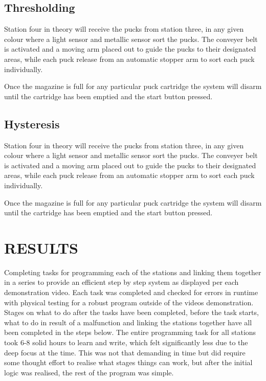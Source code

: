 \documentclass[a4paper, 10pt]{article}
\begin{document}
\subsection{Thresholding}
Station four in theory will receive the pucks from station three, in any given colour where a light sensor and metallic sensor sort the pucks. The conveyer belt is activated and a moving arm placed out to guide the pucks to their designated areas, while each puck release from an automatic stopper arm to sort each puck individually. 

Once the magazine is full for any particular puck cartridge the system will disarm until the cartridge has been emptied and the start button pressed.



\subsection{Hysteresis}
Station four in theory will receive the pucks from station three, in any given colour where a light sensor and metallic sensor sort the pucks. The conveyer belt is activated and a moving arm placed out to guide the pucks to their designated areas, while each puck release from an automatic stopper arm to sort each puck individually. 

Once the magazine is full for any particular puck cartridge the system will disarm until the cartridge has been emptied and the start button pressed.



\section{RESULTS}
Completing tasks for programming each of the stations and linking them together in a series to provide an efficient step by step system as displayed per each demonstration video. Each task was completed and checked for errors in runtime with physical testing for a robust program outside of the videos demonstration. Stages on what to do after  the tasks have been completed, before the task starts, what to do in result of a malfunction and linking the stations together have all been completed in the steps below. The entire programming task for all stations took 6-8 solid hours to learn and write, which felt significantly less due to the deep focus at the time. This was not that demanding in time but did require some thought effort to realise what stages things can work, but after the initial logic was realised, the rest of the program was simple.
\end{document}
